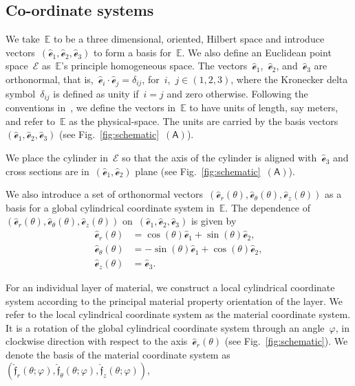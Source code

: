 \documentclass[preprint,12pt,times]{elsarticle}
\numberwithin{equation}{section}
\newcommand{\physe}{\hat{\mathscr{e}}} %
\newcommand{\physf}{\hat{\boldsymbol{\mathfrak{f}}}}
\newcommand{\pr}[1]{\left( #1 \right)}
\newcommand{\subf}[1]{\pr{\textsf{#1}}}
\renewcommand{\>}{$\Rightarrow$}
\begin{document}
\subsection{Co-ordinate systems}
We take~$\mathbb{E}$ to be a three dimensional, oriented, Hilbert space and introduce vectors~$(\physe_1,\physe_2,\physe_3)$ to form a basis for~$\mathbb{E}$. We also define an Euclidean point space~$\mathcal{E}$ as~$\mathbb{E}$'s principle homogeneous space.
The vectors~$\physe_1$,~$\physe_2$, and~$\physe_3$ are orthonormal, that is,~$\physe_i\cdot\physe_j=\delta_{ij}$, for~$i$,~$j\in (1,2,3)$, where the Kronecker delta symbol~$\delta_{ij}$ is defined as unity if~$i=j$ and zero otherwise.
Following the conventions in~\cite{rahaman2020accelerometer,deng2021angle}, we define the vectors in~$\mathbb{E}$ to have units of length, say meters, and refer to~$\mathbb{E}$ as the physical-space. The units are carried by the basis vectors~$(\physe_1,\physe_2,\physe_3)$ (see Fig.~\ref{fig:schematic}~$\subf{A}$).

We place the cylinder in~$\mathcal{E}$ so that the axis of the cylinder is aligned with~$\physe_3$ and cross sections are in~$(\physe_1,\physe_2)$ plane (see Fig.~\ref{fig:schematic}~$\subf{A}$).

We also introduce a set of orthonormal vectors~$(\physe_{r}(\theta),\physe_{\theta}(\theta),\physe_{z}(\theta))$ as a basis for a global cylindrical coordinate system in~$\mathbb{E}$. The dependence of~$(\physe_{r}(\theta),\physe_{\theta}(\theta),\physe_{z}(\theta))$ on~$(\physe_1,\physe_2,\physe_3)$ is given by
\begin{subequations}
\begin{align}
\physe_{r}(\theta) & = \cos(\theta) \physe_1 + \sin(\theta) \physe_2 , \\
\physe_{\theta}(\theta) & = -\sin(\theta) \physe_1 + \cos(\theta) \physe_2 , \\
\physe_{z} (\theta) & =  \physe_3.
\end{align}
\end{subequations}

For an individual layer of material, we construct a local cylindrical coordinate system according to the principal material property orientation of the layer. We refer to the local cylindrical coordinate system as the material coordinate system. It is a rotation of the global cylindrical coordinate system through an angle~$\varphi$, in clockwise direction with respect to the axis~$\physe_{r}(\theta)$ (see Fig.~\ref{fig:schematic}). We denote the basis of the material coordinate system as~$\pr{\physf_{r}(\theta;\varphi),\physf_{\theta}(\theta;\varphi),\physf_{z}(\theta;\varphi)}$,
\end{document}
